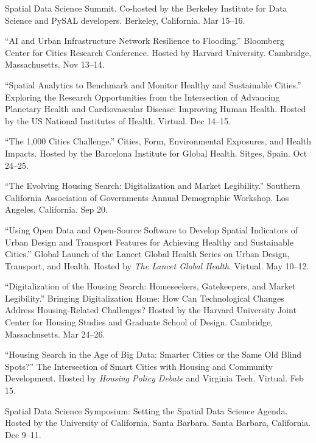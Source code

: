 \documentclass[11pt,letterpaper]{report} %
\begin{document}
\begin{tablist}

\item[2026] \tab{}Spatial Data Science Summit. Co-hosted by the Berkeley Institute for Data Science and PySAL developers. Berkeley, California. Mar 15--16.

\item[2025] \tab{}\enquote{AI and Urban Infrastructure Network Resilience to Flooding.} Bloomberg Center for Cities Research Conference. Hosted by Harvard University. Cambridge, Massachusetts. Nov 13--14.

\item[2023] \tab{}\enquote{Spatial Analytics to Benchmark and Monitor Healthy and Sustainable Cities.} Exploring the Research Opportunities from the Intersection of Advancing Planetary Health and Cardiovascular Disease: Improving Human Health. Hosted by the US National Institutes of Health. Virtual. Dec 14--15.

\item[2023] \tab{}\enquote{The 1,000 Cities Challenge.} Cities, Form, Environmental Exposures, and Health Impacts. Hosted by the Barcelona Institute for Global Health. Sitges, Spain. Oct 24--25.

\item[2023] \tab{}\enquote{The Evolving Housing Search: Digitalization and Market Legibility.} Southern California Association of Governments Annual Demographic Workshop. Los Angeles, California. Sep 20.

\item[2022] \tab{}\enquote{Using Open Data and Open-Source Software to Develop Spatial Indicators of Urban Design and Transport Features for Achieving Healthy and Sustainable Cities.} Global Launch of the Lancet Global Health Series on Urban Design, Transport, and Health. Hosted by \textit{The Lancet Global Health}. Virtual. May 10--12.

\item[2022] \tab{}\enquote{Digitalization of the Housing Search: Homeseekers, Gatekeepers, and Market Legibility.} Bringing Digitalization Home: How Can Technological Changes Address Housing-Related Challenges? Hosted by the Harvard University Joint Center for Housing Studies and Graduate School of Design. Cambridge, Massachusetts. Mar 24--26.

\item[2021] \tab{}\enquote{Housing Search in the Age of Big Data: Smarter Cities or the Same Old Blind Spots?} The Intersection of Smart Cities with Housing and Community Development. Hosted by \textit{Housing Policy Debate} and Virginia Tech. Virtual. Feb 15.

\item[2019] \tab{}Spatial Data Science Symposium: Setting the Spatial Data Science Agenda. Hosted by the University of California, Santa Barbara. Santa Barbara, California. Dec 9--11.

\end{tablist}
\end{document}

